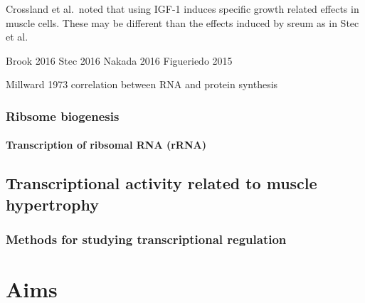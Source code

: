 \documentclass[twoside,10pt]{gihclass} %
\begin{document}
Crossland et al.~noted that using IGF-1 induces specific growth related effects in muscle cells. These may be different than the effects induced by sreum as in Stec et al.~

Brook 2016
Stec 2016
Nakada 2016
Figueriedo 2015

Millward 1973 correlation between RNA and protein synthesis

\hypertarget{ribsome-biogenesis}{%
\subsection{Ribsome biogenesis}\label{ribsome-biogenesis}}

\hypertarget{transcription-of-ribsomal-rna-rrna}{%
\subsubsection{Transcription of ribsomal RNA (rRNA)}\label{transcription-of-ribsomal-rna-rrna}}

\hypertarget{transcriptional-activity-related-to-muscle-hypertrophy}{%
\section{Transcriptional activity related to muscle hypertrophy}\label{transcriptional-activity-related-to-muscle-hypertrophy}}

\hypertarget{methods-for-studying-transcriptional-regulation}{%
\subsection{Methods for studying transcriptional regulation}\label{methods-for-studying-transcriptional-regulation}}

\hypertarget{aims}{%
\chapter{Aims}\label{aims}}
\end{document}
